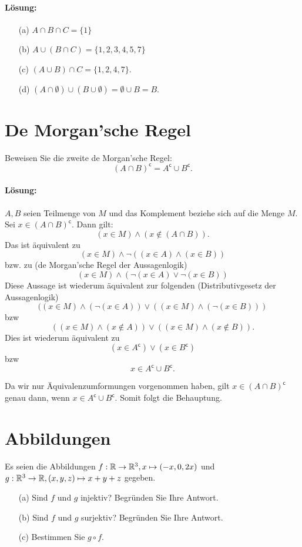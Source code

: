 \documentclass[
				a4paper,
				10pt
			]
			{scrartcl}
\begin{document}
\paragraph{L\"osung:}
\begin{itemize}
	\item[(a)] $A\cap B \cap C = \{ 1 \}$
	\item[(b)] $A\cup( B\cap C) = \{ 1,2,3,4,5, 7 \}$
	\item[(c)] $(A\cup B) \cap C = \{ 1,2,4,7\}$.
	\item[(d)] $(A\cap \emptyset) \cup (B \cup \emptyset) = \emptyset \cup B = B$.
\end{itemize}


\newpage
\section{De Morgan'sche Regel}
Beweisen Sie die zweite de Morgan'sche Regel:
$$
	(A \cap B)^{\mathsf{c}} = A^{\mathsf{c}} \cup B^{\mathsf{c}}.
$$

\paragraph{L\"osung:}
$A,B$ seien Teilmenge von $M$ und das Komplement beziehe sich auf die Menge $M$.\\

Sei $x \in (A \cap B)^{\mathsf{c}}$. Dann gilt:
$$
	(x \in M) \land (x \notin (A\cap B) ).
$$
Das ist \"aquivalent zu
$$
	(x \in M) \land \neg( (x \in A)\land (x\in B) )
$$
bzw. zu (de Morgan'sche Regel der Aussagenlogik)
$$
	(x \in M) \land ( \neg(x \in A)\lor \neg(x\in B) )
$$
Diese Aussage ist wiederum \"aquivalent zur folgenden (Distributivgesetz der Aussagenlogik)
$$
	( (x \in M) \land ( \neg(x \in A)) \lor ( (x \in M)  \land (\neg(x\in B)) )
$$
bzw
$$
	( (x \in M) \land ( x \notin A)) \lor ( (x \in M)  \land (x\notin B) ).
$$
Dies ist wiederum \"aquivalent zu
$$
	(x \in A^{\mathsf{c}}) \lor (x\in B^{\mathsf{c}})
$$
bzw
$$
	x \in A^{\mathsf{c}}\cup B^{\mathsf{c}}.
$$

Da wir nur \"Aquivalenzumformungen vorgenommen haben, gilt $x \in (A \cap B)^{\mathsf{c}}$ genau dann, wenn $x \in A^{\mathsf{c}}\cup B^{\mathsf{c}}$. Somit folgt die Behauptung.

\newpage
\section{Abbildungen}
Es seien die Abbildungen $f:\mathbb{R} \to \mathbb{R}^3, x \mapsto (-x, 0, 2x)$ und $g: \mathbb{R}^3 \to \mathbb{R}, (x,y,z) \mapsto x+y+z$ gegeben. 
\begin{itemize}
\item[(a)] Sind $f$ und $g$ injektiv? Begr\"unden Sie Ihre Antwort.
\item[(b)] Sind $f$ und $g$ surjektiv? Begr\"unden Sie Ihre Antwort.
\item[(c)] Bestimmen Sie $g \circ f$.
\end{itemize}
\end{document}
